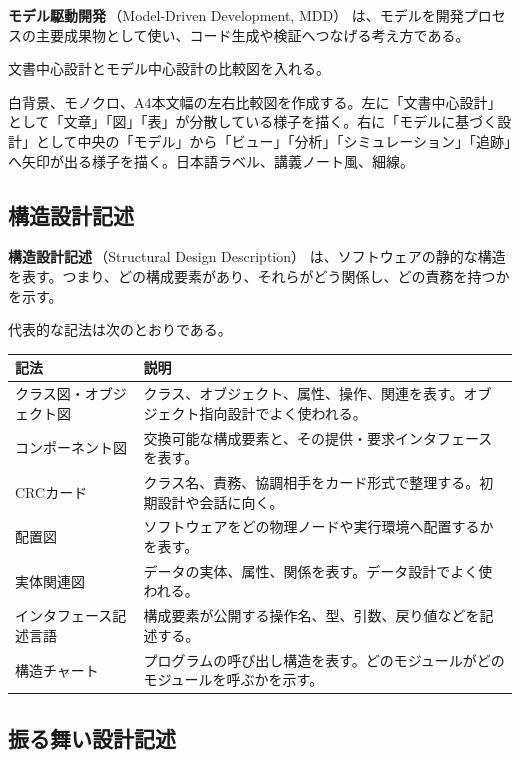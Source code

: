 \documentclass[10.5pt,a4paper]{ltjsarticle}
\newcommand{\term}[2]{\textbf{#1}\,（#2）}
\begin{document}
\term{モデル駆動開発}{Model-Driven Development, MDD} は、モデルを開発プロセスの主要成果物として使い、コード生成や検証へつなげる考え方である。

\begin{todobox}
文書中心設計とモデル中心設計の比較図を入れる。
\end{todobox}
\begin{promptbox}
白背景、モノクロ、A4本文幅の左右比較図を作成する。左に「文書中心設計」として「文章」「図」「表」が分散している様子を描く。右に「モデルに基づく設計」として中央の「モデル」から「ビュー」「分析」「シミュレーション」「追跡」へ矢印が出る様子を描く。日本語ラベル、講義ノート風、細線。
\end{promptbox}

\subsection{構造設計記述}

\term{構造設計記述}{Structural Design Description} は、ソフトウェアの静的な構造を表す。つまり、どの構成要素があり、それらがどう関係し、どの責務を持つかを示す。

代表的な記法は次のとおりである。

\begin{longtable}{L{42mm}L{112mm}}
\toprule
\textbf{記法} & \textbf{説明} \\
\midrule
\endhead
クラス図・オブジェクト図 & クラス、オブジェクト、属性、操作、関連を表す。オブジェクト指向設計でよく使われる。 \\
コンポーネント図 & 交換可能な構成要素と、その提供・要求インタフェースを表す。 \\
CRCカード & クラス名、責務、協調相手をカード形式で整理する。初期設計や会話に向く。 \\
配置図 & ソフトウェアをどの物理ノードや実行環境へ配置するかを表す。 \\
実体関連図 & データの実体、属性、関係を表す。データ設計でよく使われる。 \\
インタフェース記述言語 & 構成要素が公開する操作名、型、引数、戻り値などを記述する。 \\
構造チャート & プログラムの呼び出し構造を表す。どのモジュールがどのモジュールを呼ぶかを示す。 \\
\bottomrule
\end{longtable}

\subsection{振る舞い設計記述}
\end{document}
